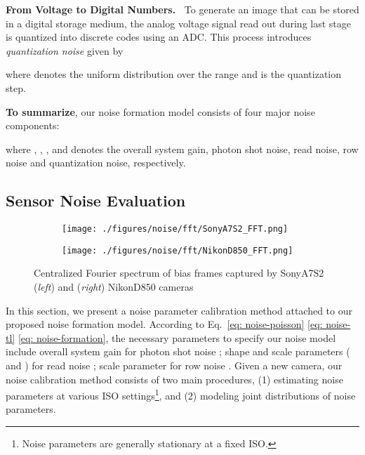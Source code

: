 \documentclass[10pt,twocolumn,letterpaper]{article}
\begin{document}
\vspace{3pt}
\noindent\textbf{From Voltage to Digital Numbers.~}
To generate an image that can be stored in a digital storage medium, the
analog voltage signal read out during last stage is quantized into discrete
codes using an ADC. This process introduces \textit{quantization noise}  given by
\vspace{-1mm}

where  denotes the uniform distribution over the range
 and  is the quantization step.

\textbf{To summarize}, our noise formation model consists of four major noise components:
\vspace{-1mm}

where , , ,  and  denotes the overall system gain, photon shot noise, read noise, row noise and quantization noise, respectively. 

\subsection{Sensor Noise Evaluation} \label{sec:noise-param}

\begin{figure}[!t]
\centering
\begin{subfigure}[b]{.35\linewidth}
\centering
\texttt{[image: ./figures/noise/fft/SonyA7S2\_FFT.png]}
\end{subfigure}
\begin{subfigure}[b]{.35\linewidth}
\centering
\texttt{[image: ./figures/noise/fft/NikonD850\_FFT.png]}
\end{subfigure}
\vspace{-1mm}
\caption{Centralized Fourier spectrum of bias frames captured by SonyA7S2 (\textit{left}) and (\textit{right}) NikonD850 cameras}
\vspace{-3mm}
\label{fig:fft_bf}
\end{figure}

In this section, we present a noise parameter calibration method attached to our proposed noise formation model. According to Eq.~\eqref{eq: noise-poisson} \eqref{eq: noise-tl} \eqref{eq: noise-formation}, the necessary parameters to specify our noise model include
overall system gain  for photon shot noise ; shape and scale parameters
( and ) for read noise ;  scale parameter  for row noise . 
Given a new camera,  our noise calibration method consists of two main procedures, \ie (1) estimating noise parameters at various ISO settings\footnote{Noise parameters are generally stationary at a fixed ISO.}, and (2)  modeling joint distributions of noise parameters. 
\end{document}
